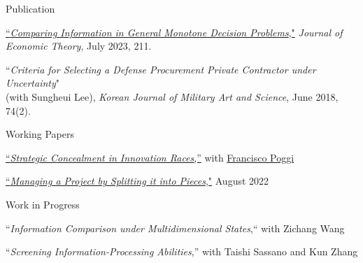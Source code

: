 \begin{rSection}{Publication}
	
	\begin{etaremune}
		\item \href{https://yonggyun-yg-kim.github.io/files/Research%20papers/GMDP_JET.pdf}{``\textit{Comparing Information in General Monotone Decision Problems},"} 
		\textit{Journal of Economic Theory}, July 2023, 211. 
		
		\item 
		``\textit{Criteria for Selecting a Defense Procurement Private Contractor under Uncertainty}"\\
		(with Sungheui Lee), \textit{Korean Journal of Military Art and Science}, June 2018, 74(2). 
	\end{etaremune}
	
	
	
\end{rSection}

\begin{rSection}{Working Papers}
	
	\begin{etaremune}
		
		\item \href{https://yonggyun-yg-kim.github.io/files/Research%20papers/SCIR_public.pdf}{``\textit{Strategic Concealment in Innovation Races},''}   with \href{https://www.franciscopoggi.com/}{Francisco Poggi}
		
		\item \href{https://ssrn.com/abstract=3450802}{``\textit{Managing a Project by Splitting it into Pieces},"} August 2022	

	\end{etaremune}
	
	
\end{rSection}


\begin{rSection}{Work in Progress}
	\begin{etaremune}

		\item ``\textit{Information Comparison under Multidimensional States},`` with Zichang Wang

		\item 	``\textit{Screening Information-Processing Abilities},'' with Taishi Sassano and Kun Zhang

	\end{etaremune}
\end{rSection}



